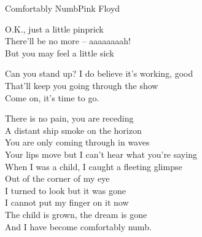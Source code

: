 \begin{song}{Comfortably Numb}{Pink Floyd}
\medskip

\begin{guitar}
O.K., just a little pinprick\\
There'll be no more – aaaaaaaah!\\
But you may feel a little sick\\
\end{guitar}

\begin{guitar}
Can you stand up? I do believe it's working, good\\
That'll keep you going through the show\\
Come on, it's time to go.\\
\end{guitar}

\medskip
{}
\begin{guitar}
There is no pain, you are receding\\
A distant ship smoke on the horizon\\
You are only coming through in waves\\
Your lips move but I can't hear what you're saying\\
When I was a child, I caught a fleeting glimpse\\
Out of the corner of my eye\\
I turned to look but it was gone\\
I cannot put my finger on it now\\
The child is grown, the dream is gone\\
And  I have become comfortably numb.\\
\end{guitar}

\medskip
{}
\end{song}
